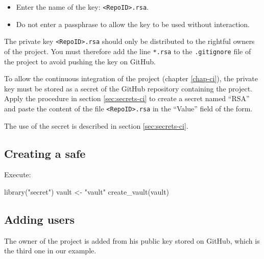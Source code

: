 \documentclass[
  12pt,
  american,
  a4paper,
  extrafontsizes,onecolumn,openright
  ]{memoir}
\newenvironment{Shaded}{\begin{snugshade}}{\end{snugshade}}
\newcommand{\FunctionTok}[1]{\textcolor[rgb]{0.00,0.00,0.00}{#1}}
\newcommand{\NormalTok}[1]{#1}
\newcommand{\OtherTok}[1]{\textcolor[rgb]{0.56,0.35,0.01}{#1}}
\newcommand{\StringTok}[1]{\textcolor[rgb]{0.31,0.60,0.02}{#1}}
\providecommand{\tightlist}{%
  \setlength{\itemsep}{0pt}\setlength{\parskip}{0pt}}
\begin{document}
\begin{itemize}
\tightlist
\item
  Enter the name of the key: \texttt{\textless{}RepoID\textgreater{}.rsa}.
\item
  Do not enter a passphrase to allow the key to be used without interaction.
\end{itemize}

The private key \texttt{\textless{}RepoID\textgreater{}.rsa} should only be distributed to the rightful owners of the project.
You must therefore add the line \texttt{*.rsa} to the \texttt{.gitignore} file of the project to avoid pushing the key on GitHub.

To allow the continuous integration of the project (chapter \ref{chap-ci}), the private key must be stored as a secret of the GitHub repository containing the project.
Apply the procedure in section \ref{sec:secrets-ci} to create a secret named \enquote{RSA} and paste the content of the file \texttt{\textless{}RepoID\textgreater{}.rsa} in the \enquote{Value} field of the form.

The use of the secret is described in section \ref{sec:secrets-ci}.

\hypertarget{creating-a-safe}{%
\subsection{Creating a safe}\label{creating-a-safe}}

Execute:

\scriptsize

\begin{Shaded}
\begin{Highlighting}[]
\FunctionTok{library}\NormalTok{(}\StringTok{"secret"}\NormalTok{)}
\NormalTok{vault }\OtherTok{\textless{}{-}} \StringTok{"vault"}
\FunctionTok{create\_vault}\NormalTok{(vault)}
\end{Highlighting}
\end{Shaded}

\normalsize

\hypertarget{adding-users}{%
\subsection{Adding users}\label{adding-users}}

The owner of the project is added from his public key stored on GitHub, which is the third one in our example.

\scriptsize
\end{document}
